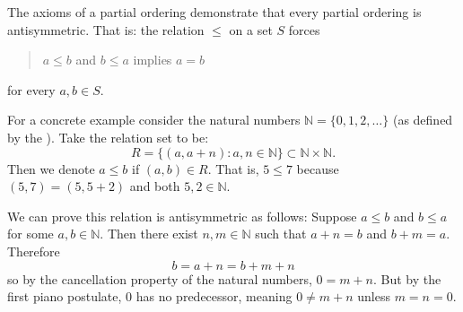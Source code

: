 \documentclass[12pt]{article}
\begin{document}
The axioms of a partial ordering demonstrate that every partial ordering is antisymmetric.  That is: the relation $\leq $ on a set $S$ forces 
\begin{quote}
$a\leq b$ and $b\leq a$ implies $a=b$
\end{quote}
for every $a,b\in S$.

For a concrete example consider the natural numbers $\mathbb{N}=\{0,1,2,\dots\}$ (as defined by the ).  Take the relation set to be:
\[R=\{(a,a+n):a,n\in \mathbb{N}\}\subset \mathbb{N}\times \mathbb{N}.\]
Then we denote $a\leq b$ if $(a,b)\in R$.  That is, $5\leq 7$ because $(5,7)=(5,5+2)$ and both $5,2\in\mathbb{N}$.

We can prove this relation is antisymmetric as follows: Suppose $a\leq b$ and
$b\leq a$ for some $a,b\in\mathbb{N}$.  Then there exist $n,m\in\mathbb{N}$
such that $a+n=b$ and $b+m=a$.  Therefore
\[b=a+n=b+m+n\]
so by the cancellation property of the natural numbers, $0=m+n$.  But by the first piano postulate, 0 has no predecessor, meaning $0\neq m+n$ unless $m=n=0$.

\end{document}
